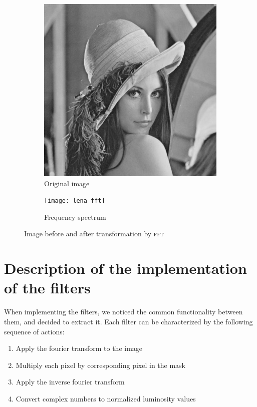 \documentclass[12pt]{article}
\newcommand*{\fft}{\textsc{fft}}
\begin{document}
\begin{figure}[H]\centering
    \begin{subfigure}[ht]{.4\textwidth}\centering
        \includegraphics[width=\textwidth]{lena}
        \caption{Original image}
    \end{subfigure}
    \hspace*{2em}
    \begin{subfigure}[ht]{.4\textwidth}\centering
        \texttt{[image: lena\_fft]}
        \caption{Frequency spectrum}
    \end{subfigure}
    \caption{Image before and after transformation by \fft}
\end{figure}

\section{Description of the implementation of the filters}

When implementing the filters, we noticed the common functionality between them, and decided to extract it.
Each filter can be characterized by the following sequence of actions:

\begin{enumerate}
    \item Apply the fourier transform to the image
    \item Multiply each pixel by corresponding pixel in the mask
    \item Apply the inverse fourier transform
    \item Convert complex numbers to normalized luminosity values
\end{enumerate}
\end{document}
